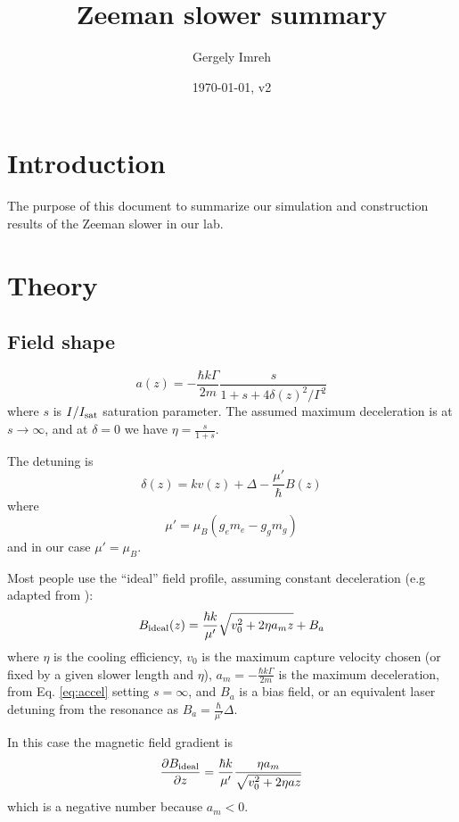 \documentclass[12pt,a4paper]{article}
\author{Gergely Imreh}
\title{Zeeman slower summary}
\date{\today, v2}
\begin{document}
\maketitle

\section{Introduction}

The purpose of this document to summarize our simulation and construction results of the Zeeman slower in our lab.

\section{Theory}

\subsection{Field shape}

\begin{equation}
a(z) = -\frac{\hbar k \Gamma}{2 m} \frac{s}{1 + s + 4 \delta(z)^2 / \Gamma^2}
\label{eq:accel}
\end{equation}
where $s$ is $I/I_{\rm sat}$ saturation parameter. The assumed maximum deceleration is at $s \rightarrow \infty$, and at $\delta = 0$ we have $\eta = \frac{s}{1 + s}$.

The detuning is 
\begin{equation}
\delta(z) = k v(z) + \Delta - \frac{\mu'}{\hbar} B(z)
\end{equation}
where 
\begin{equation}
\mu' = \mu_{B}(g_e m_e - g_g m_g)
\end{equation}
and in our case $\mu' = \mu_{B}$.

Most people use the ``ideal'' field profile, assuming constant deceleration (e.g adapted from \cite{Bell2010}):
\begin{equation}
B_{\rm ideal}(z) = \frac{\hbar k}{\mu'}\sqrt{v_0^2 + 2 \eta a_m z} + B_a
\label{eq:bideal}
\end{equation}
where $\eta$ is the cooling efficiency, $v_0$ is the maximum capture velocity chosen (or fixed by a given slower length and $\eta$), $a_m = -\frac{\hbar k \Gamma}{2 m}$ is the maximum deceleration, from Eq. \ref{eq:accel} setting $s = \infty$, and $B_a$ is a bias field, or an equivalent laser detuning from the resonance as $B_a = \frac{\hbar}{\mu'} \Delta$.

In this case the magnetic field gradient is
\begin{equation}
\frac{\partial B_{\rm ideal}}{\partial z} = \frac{\hbar k}{\mu'} \frac{\eta a_m}{\sqrt{v_0^2 + 2 \eta a z}}
\end{equation}
which is a negative number because $a_m < 0$.
\end{document}
